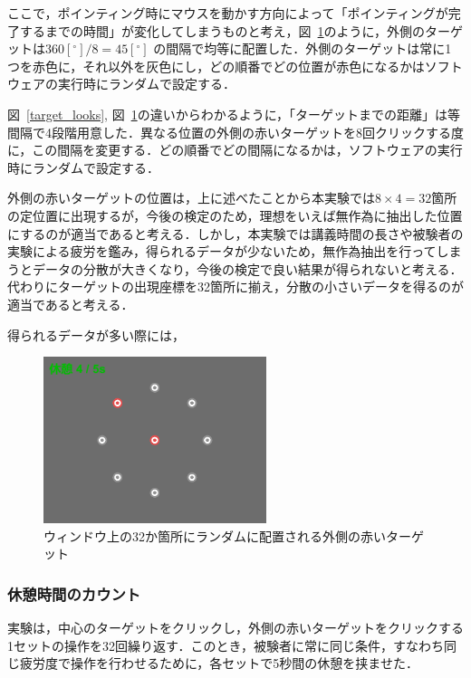 \documentclass[a4paper, papersize, titlepage]{jsarticle}
\begin{document}
\begin{multicols}{2}
ここで，ポインティング時にマウスを動かす方向によって「ポインティングが完了するまでの時間」が変化してしまうものと考え，図~\ref{target_pos}のように，外側のターゲットは$360[^\circ] / 8 = 45[^\circ]$ の間隔で均等に配置した．外側のターゲットは常に1つを赤色に，それ以外を灰色にし，どの順番でどの位置が赤色になるかはソフトウェアの実行時にランダムで設定する．

図~\ref{target_looks}, 図~\ref{target_pos}の違いからわかるように，「ターゲットまでの距離」は等間隔で4段階用意した．異なる位置の外側の赤いターゲットを8回クリックする度に，この間隔を変更する．どの順番でどの間隔になるかは，ソフトウェアの実行時にランダムで設定する．

外側の赤いターゲットの位置は，上に述べたことから本実験では$8\times4 = 32$箇所の定位置に出現するが，今後の検定のため，理想をいえば無作為に抽出した位置にするのが適当であると考える．しかし，本実験では講義時間の長さや被験者の実験による疲労を鑑み，得られるデータが少ないため，無作為抽出を行ってしまうとデータの分散が大きくなり，今後の検定で良い結果が得られないと考える．代わりにターゲットの出現座標を32箇所に揃え，分散の小さいデータを得るのが適当であると考える．

得られるデータが多い際には，

\begin{figure}[H]
 \centering
   \includegraphics[width=65mm]{target_pos.png}
 \caption{ウィンドウ上の32か箇所にランダムに配置される外側の赤いターゲット}
 \label{target_pos}
\end{figure}
\noindent



\subsubsection{休憩時間のカウント}
実験は，中心のターゲットをクリックし，外側の赤いターゲットをクリックする1セットの操作を32回繰り返す．このとき，被験者に常に同じ条件，すなわち同じ疲労度で操作を行わせるために，各セットで5秒間の休憩を挟ませた．


\end{multicols}
\end{document}
